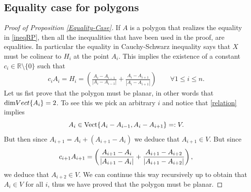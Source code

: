 \documentclass[12pt,english]{smfart} %
\theoremstyle{remark}
\newcommand{\R}{\mathbb{R}}
\begin{document}
  
\subsection{Equality case for polygons} 


 

\begin{proof}[Proof of Proposition \ref{Equality-Case}] If $A$ is a polygon that realizes the equality in \eqref{ineqRP}, then all the inequalities that have been used in the proof, are equalities. In particular the equality in Cauchy-Schwarz inequality says that $X$ must be colinear to $H_i$ at the point $A_i$. This implies the existence of a constant $c_i \in \R \setminus \{0\}$ such that 
\begin{eqnarray}
c_iA_i=H_i =\left(\frac{A_{i}-A_{i-1}}{|A_i-A_{i-1}|}+ \frac{A_{i}-A_{i+1}}{|A_i-A_{i+1}|}\right)\quad \quad \forall 1\leqslant i\leqslant n. \label{relation}
\end{eqnarray}
Let us fist prove that the polygon must be planar, in other words that  ${\rm dim} Vect\{ A_i\}=2$. To see this we pick an arbitrary $i$ and notice that \eqref{relation} implies 
$$A_i \in \textnormal{Vect}\{ A_i - A_{i-1} , A_i-A_{i+1}\}=:V.$$ But then since $A_{i+1}=A_i + (A_{i+1} -A_i)$ we deduce that $A_{i+1} \in V$. But since 
\begin{eqnarray}
c_{i+1}A_{i+1}=\left(\frac{A_{i+1}-A_{i}}{|A_{i+1}-A_{i}|}+ \frac{A_{i+1}-A_{i+2}}{|A_{i+1}-A_{i+2}|}\right) \notag,
\end{eqnarray}
we deduce that $A_{i+2}\in V$. We can continue this way recursively up to obtain that $A_i \in V$ for all $i$, thus we have proved that the polygon must be planar. 


\end{proof}
\end{document}
